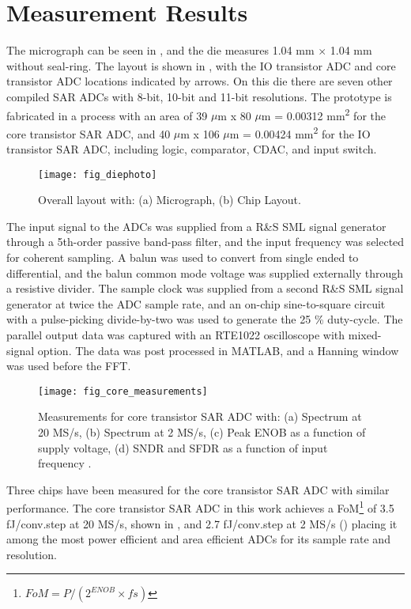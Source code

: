 \section{Measurement Results} \label{measurements}
The micrograph can be seen in , and the die measures
1.04 mm $\times$ 1.04 mm without seal-ring.  The layout is shown in
, with the IO transistor ADC and core transistor ADC locations
indicated by arrows. On this die there are seven other compiled SAR ADCs with
8-bit, 10-bit and 11-bit resolutions.
The prototype is fabricated in a {\technm} process with an area of
39 $\mu$m  x 80 $\mu$m = 0.00312 mm\textsuperscript{2} for the core
transistor SAR ADC, and 40 $\mu$m x 106 $\mu$m =
0.00424 mm\textsuperscript{2} for the IO transistor SAR ADC, including logic, comparator, CDAC,
and input switch.
\begin{figure}[t]
\centerline{\texttt{[image: fig\_diephoto]}}
\caption[Caption without FN]{Overall layout with: (a) Micrograph, (b) Chip Layout.}
\label{fig_die}
\end{figure}

The input signal to the ADCs was supplied from a R\&S SML
signal generator through a 5th-order passive band-pass
filter, and the input frequency was selected for coherent sampling. A balun
was used to convert from single ended to differential, and the balun common
mode voltage was supplied externally through a resistive divider. The sample clock was
supplied from a second R\&S SML signal generator at twice the ADC
sample rate, and an on-chip sine-to-square circuit with a pulse-picking
divide-by-two  was used to generate the 25 \% duty-cycle. The
parallel output data was captured with an RTE1022 oscilloscope with
mixed-signal option. The data was post processed in MATLAB, and a
Hanning window was used before the FFT.

\begin{figure*}[t!]
  \centerline{\texttt{[image: fig\_core\_measurements]}}
  \caption{Measurements for core transistor SAR ADC with: (a) Spectrum
    at 20 MS/s, (b) Spectrum at 2 MS/s, (c) Peak ENOB as a function of
    supply voltage, (d) SNDR and SFDR as a function of input frequency
    .}
  \label{fig_core}
\end{figure*}
Three chips have been measured for the core transistor SAR ADC with
similar performance. The core
transistor SAR ADC in this work achieves
a FoM\footnote{$FoM = P/(2^{ENOB} \times fs)$} of 3.5 fJ/conv.step
at 20 MS/s, shown in , and 2.7 fJ/conv.step at 2 MS/s () placing it among the most power
efficient and area efficient ADCs for its sample rate and
resolution.

